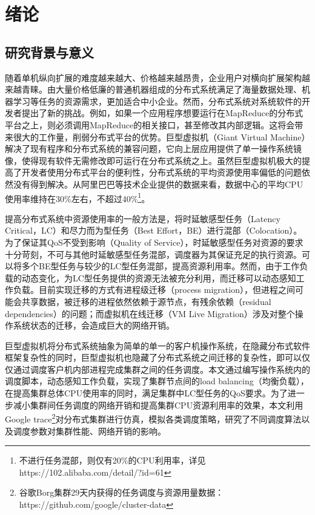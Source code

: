 
\chapter{绪论}
\label{chap:Intro}
\section{研究背景与意义}
随着单机纵向扩展的难度越来越大、价格越来越昂贵，企业用户对横向扩展架构越来越青睐。由大量价格低廉的普通机器组成的分布式系统满足了海量数据处理、机器学习等任务的资源需求，更加适合中小企业。然而，分布式系统对系统软件的开发者提出了新的挑战。例如，如果一个应用程序想要运行在MapReduce\cite{MapReduce}的分布式平台之上，则必须调用MapReduce的相关接口，甚至修改其内部逻辑。这将会带来很大的工作量，削弱分布式平台的优势。巨型虚拟机（Giant Virtual Machine）\cite{giantvm}解决了现有程序和分布式系统的兼容问题，它向上层应用提供了单一操作系统镜像，使得现有软件无需修改即可运行在分布式系统之上。虽然巨型虚拟机极大的提高了开发者使用分布式平台的便利性，分布式系统的平均资源使用率偏低的问题依然没有得到解决。从阿里巴巴等技术企业提供的数据来看，数据中心的平均CPU使用率维持在30\%左右，不超过40\%\footnote{不进行任务混部，则仅有20\%的CPU利用率，详见https://102.alibaba.com/detail/?id=61}。

提高分布式系统中资源使用率的一般方法是，将时延敏感型任务（Latency Critical，LC）和尽力而为型任务（Best Effort，BE）进行混部（Colocation）。为了保证其QoS不受到影响（Quality of Service），时延敏感型任务对资源的要求十分苛刻，不可与其他时延敏感型任务混部，调度器为其保证充足的执行资源。可以将多个BE型任务与较少的LC型任务混部，提高资源利用率。然而，由于工作负载的动态变化，为LC型任务提供的资源无法被充分利用，而迁移可以动态感知工作负载。目前实现迁移的方式有进程级迁移（process migration），但进程之间可能会共享数据，被迁移的进程依然依赖于源节点，有残余依赖（residual dependencies）\cite{residual}的问题；而虚拟机在线迁移（VM Live Migration）\cite{livemigration}涉及对整个操作系统状态的迁移，会造成巨大的网络开销。

巨型虚拟机将分布式系统抽象为简单的单一的客户机操作系统，在隐藏分布式软件框架复杂性的同时，巨型虚拟机也隐藏了分布式系统之间迁移的复杂性，即可以仅仅通过调度客户机内部进程完成集群之间的任务调度。本文通过编写操作系统内的调度脚本，动态感知工作负载，实现了集群节点间的load balancing（均衡负载），在提高集群总体CPU使用率的同时，满足集群中LC型任务的QoS要求。为了进一步减小集群间任务调度的网络开销和提高集群CPU资源利用率的效果，本文利用Google trace\footnote{谷歌Borg集群29天内获得的任务调度与资源用量数据：https://github.com/google/cluster-data}对分布式集群进行仿真，模拟各类调度策略，研究了不同调度算法以及调度参数对集群性能、网络开销的影响。

